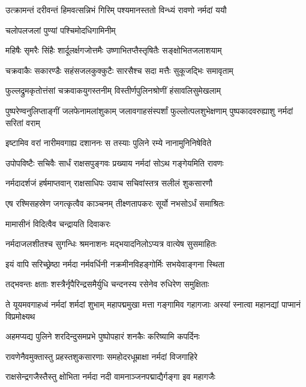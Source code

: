 \twolineshloka
{उत्क्रामन्तं दरीवन्तं हिमवत्सन्निभं गिरिम्}
{पश्यमानस्ततो विन्ध्यं रावणो नर्मदां ययौ} %

\onelineshloka
{चलोपलजलां पुण्यां पश्चिमोदधिगामिनीम्} %

\twolineshloka
{महिषैः सृमरैः सिंहैः शार्दूलर्क्षगजोत्तमैः}
{उष्णाभितप्तैस्तृषितैः सङ्क्षोभितजलाशयाम्} %

\twolineshloka
{चक्रवाकैः सकारण्डैः सहंसजलकुक्कुटैः}
{सारसैश्च सदा मत्तैः सुकूजद्भिः समावृताम्} %

\twolineshloka
{फुल्लद्रुमकृतोत्तंसां चक्रवाकयुगस्तनीम्}
{विस्तीर्णपुलिनश्रोणीं हंसावलिसुमेखलाम्} %

\threelineshloka
{पुष्परेण्वनुलिप्ताङ्गीं जलफेनामलांशुकाम्}
{जलावगाहसंस्पर्शां फुल्लोत्पलशुभेक्षणाम्}
{पुष्पकादवरुह्याशु नर्मदां सरितां वराम्} %

\twolineshloka
{इष्टामिव वरां नारीमवगाह्य दशाननः}
{स तस्याः पुलिने रम्ये नानामुनिनिषेविते} %

\twolineshloka
{उपोपविष्टैः सचिवैः सार्धं राक्षसपुङ्गवः}
{प्रख्याय नर्मदां सोऽथ गङ्गेयमिति रावणः} %

\twolineshloka
{नर्मदादर्शजं हर्षमाप्तवान् राक्षसाधिपः}
{उवाच सचिवांस्तत्र सलीलं शुकसारणौ} %

\twolineshloka
{एष रश्मिसहस्रेण जगत्कृत्वैव काञ्चनम्}
{तीक्ष्णतापकरः सूर्यो नभसोऽर्धं समाश्रितः} %

\onelineshloka
{मामासीनं विदित्वैव चन्द्रायति दिवाकरः} %

\twolineshloka
{नर्मदाजलशीतश्च सुगन्धिः श्रमनाशनः}
{मद्भयादनिलोऽप्यत्र वात्येष सुसमाहितः} %

\twolineshloka
{इयं वापि सरिच्छ्रेष्ठा नर्मदा नर्मवर्धिनी}
{नक्रमीनविहङ्गोर्मिः सभयेवाङ्गना स्थिता} %

\twolineshloka
{तद्भवन्तः क्षताः शस्त्रैर्नृपैरिन्द्रसमैर्युधि}
{चन्दनस्य रसेनेव रुधिरेण समुक्षिताः} %

\threelineshloka
{ते यूयमवगाहध्वं नर्मदां शर्मदां शुभाम्}
{महापद्ममुखा मत्ता गङ्गामिव गहागजाः}
{अस्यां स्नात्वा महानद्यां पाप्मानं विप्रमोक्ष्यथ} %

\twolineshloka
{अहमप्यद्य पुलिने शरदिन्दुसमप्रभे}
{पुष्पोपहारं शनकैः करिष्यामि कपर्दिनः} %

\twolineshloka
{रावणेनैवमुक्तास्तु प्रहस्तशुकसारणाः}
{समहोदरधूम्राक्षा नर्मदां विजगाहिरे} %

\twolineshloka
{राक्षसेन्द्रगजैस्तैस्तु क्षोभिता नर्मदा नदी}
{वामनाञ्जनपद्माद्यैर्गङ्गा इव महागजैः} %

